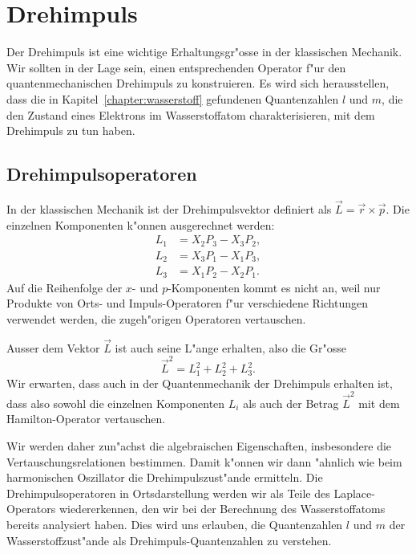 \chapter{Drehimpuls\label{chapter:drehimpuls}}
\rhead{}
Der Drehimpuls ist eine wichtige Erhaltungsgr"osse in der klassischen
Mechanik. Wir sollten in der Lage sein, einen entsprechenden Operator
f"ur den quantenmechanischen Drehimpuls zu konstruieren.
Es wird sich herausstellen, dass die in Kapitel~\ref{chapter:wasserstoff}
gefundenen Quantenzahlen $l$ und $m$, die
den Zustand eines Elektrons im Wasserstoffatom charakterisieren, mit
dem Drehimpuls zu tun haben.

%
%

\section{Drehimpulsoperatoren\label{section:drehimpulsoperatoren}}
In der klassischen Mechanik ist der Drehimpulsvektor definiert
als $\vec L=\vec r\times \vec p$. Die einzelnen Komponenten k"onnen
ausgerechnet werden:
\begin{align*}
L_1&=X_2P_3-X_3P_2,\\
L_2&=X_3P_1-X_1P_3,\\
L_3&=X_1P_2-X_2P_1.
\end{align*}
%
Auf die Reihenfolge der $x$- und $p$-Komponenten kommt es nicht an,
weil nur Produkte von Orts- und Impuls-Operatoren f"ur verschiedene
Richtungen verwendet werden, die zugeh"origen Operatoren vertauschen.

Ausser dem Vektor $\vec L$ ist auch seine L"ange erhalten, also
die Gr"osse
\[
\vec L^2=L_1^2+L_2^2+L_3^2.
\]
%
Wir erwarten, dass auch in der Quantenmechanik der Drehimpuls
erhalten ist, dass also sowohl die einzelnen Komponenten $L_i$ 
als auch der Betrag $\vec L^2$ mit dem Hamilton-Operator vertauschen.

Wir werden daher zun"achst die algebraischen Eigenschaften, insbesondere
die Vertauschungsrelationen bestimmen. Damit k"onnen wir dann "ahnlich
wie beim harmonischen Oszillator die Drehimpulszust"ande ermitteln.
Die Drehimpulsoperatoren in Ortsdarstellung werden wir als Teile
des Laplace-Operators wiedererkennen, den wir bei der Berechnung
des Wasserstoffatoms bereits analysiert haben. Dies wird uns erlauben,
die Quantenzahlen $l$ und $m$ der Wasserstoffzust"ande als
Drehimpuls-Quantenzahlen zu verstehen.

